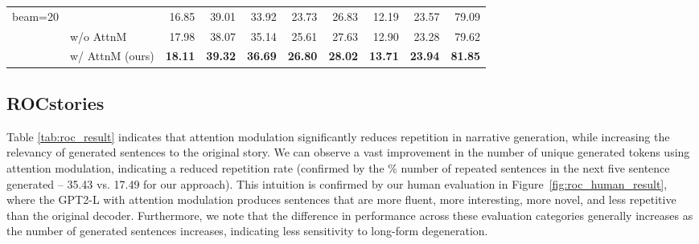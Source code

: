 \documentclass[11pt,a4paper]{article}
\newcommand{\alg}{attention modulation}
\begin{document}
\begin{table*}[t]
{\begin{tabular}{ll|rr|rr|rrr|r}
\multirow{3}{*}{beam=20}& \citet{lin-etal-2020-commongen} & 16.85&39.01&33.92&23.73&26.83&12.19&23.57&79.09\\
&  w/o AttnM    & 17.98        & 38.07        & 35.14        & 25.61       & 27.63   & 12.90 & 23.28  & 79.62 \\
 &  w/ AttnM (ours)  & \textbf{18.11}         & \textbf{39.32}        & \textbf{36.69}        & \textbf{26.80}        & \textbf{28.02}   & \textbf{13.71} & \textbf{23.94}  & \textbf{81.85}\\ \bottomrule
\end{tabular}}
\caption{CommonGen test results of the fine-tuned GPT2-L  w/ or w/o \alg{} based on different decoding algorithms. }\label{tab:commongen_greedy}
\end{table*}

\begin{table}[t]
\centering
{}
\caption{Evaluations of the fine-tune GPT2-L on $\alpha$NLG  using greedy decoding.}\label{tab:anlg_auto_result}
\end{table}


\subsection{ROCstories}\label{subsec:result_roc}
 Table \ref{tab:roc_result} indicates that \alg{} significantly reduces repetition in narrative generation, while increasing the relevancy of generated sentences to the original story.  We can observe a vast improvement in the number of unique generated tokens using \alg{}, indicating a reduced repetition rate (confirmed by the \% number of repeated sentences in the next five sentence generated -- 35.43 vs. 17.49 for our approach). %
This intuition is confirmed by our human evaluation in Figure~\ref{fig:roc_human_result}, where the GPT2-L with \alg{} produces sentences that are more fluent, more interesting, more novel, and less repetitive than the original decoder. Furthermore, we note that the difference in performance across these evaluation categories generally increases as the number of generated sentences increases, indicating less sensitivity to long-form degeneration.
\end{document}
